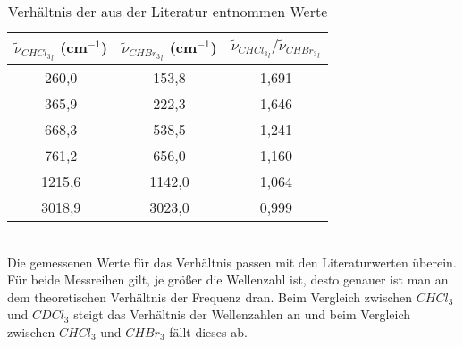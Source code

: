 \begin{table}[h]
    \centering\begin{tabular}{c|c|c}
        $\tilde{\nu}_{{CHCl_3}_l}$ (cm$^{-1}$) & $\tilde{\nu}_{{CHBr_3}_l}$ (cm$^{-1}$) & $\tilde{\nu}_{{CHCl_3}_l}/\tilde{\nu}_{{CHBr_3}_l}$\\\hline
        260,0&153,8&1,691\\
        365,9&222,3&1,646\\
        668,3&538,5&1,241\\
        761,2&656,0&1,160\\
        1215,6&1142,0&1,064\\
        3018,9&3023,0&0,999
    \end{tabular}
    \caption{Verhältnis der aus der Literatur entnommen Werte}
\end{table}\\
Die gemessenen Werte für das Verhältnis passen mit den Literaturwerten überein.
Für beide Messreihen gilt, je größer die Wellenzahl ist, desto genauer ist man an dem theoretischen Verhältnis der Frequenz dran.
Beim Vergleich zwischen $CHCl_3$ und $CDCl_3$ steigt das Verhältnis der Wellenzahlen an und beim Vergleich zwischen $CHCl_3$ und $CHBr_3$ fällt dieses ab.
